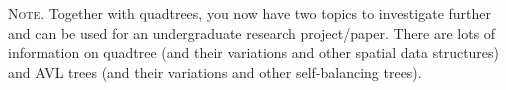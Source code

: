 \textsc{Note.}
Together with quadtrees, you now have two topics to investigate
further and can be used for an undergraduate research project/paper.
There are lots of information on quadtree (and their variations and other
spatial data structures)
and AVL trees (and their variations and other self-balancing trees).
